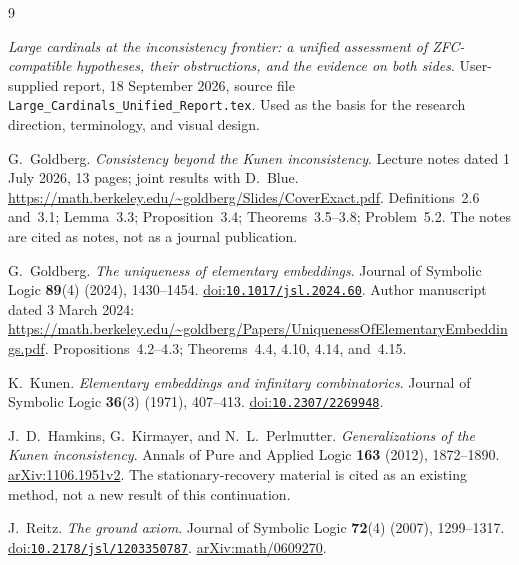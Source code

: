 \documentclass[11pt,letterpaper]{article}
\theoremstyle{definition}
\newcommand{\arxiv}[1]{\href{https://arxiv.org/abs/#1}{arXiv:#1}}
\newcommand{\doi}[1]{\href{https://doi.org/#1}{doi:\nolinkurl{#1}}}
\begin{document}
\clearpage
{}
{}
\begin{thebibliography}{9}
\small
\setlength{\itemsep}{6pt}
\setlength{\parskip}{1pt}

\emph{Large cardinals at the inconsistency frontier: a unified assessment of ZFC-compatible hypotheses, their obstructions, and the evidence on both sides}.
User-supplied report, 18 September 2026, source file
\texttt{Large\_Cardinals\_Unified\_Report.tex}.
Used as the basis for the research direction, terminology, and visual design.

G.~Goldberg.
\emph{Consistency beyond the Kunen inconsistency}.
Lecture notes dated 1 July 2026, 13 pages; joint results with D.~Blue.
\url{https://math.berkeley.edu/~goldberg/Slides/CoverExact.pdf}.
Definitions~2.6 and~3.1; Lemma~3.3; Proposition~3.4; Theorems~3.5--3.8; Problem~5.2.
The notes are cited as notes, not as a journal publication.

G.~Goldberg.
\emph{The uniqueness of elementary embeddings}.
Journal of Symbolic Logic \textbf{89}(4) (2024), 1430--1454.
\doi{10.1017/jsl.2024.60}.
Author manuscript dated 3 March 2024:
\url{https://math.berkeley.edu/~goldberg/Papers/UniquenessOfElementaryEmbeddings.pdf}.
Propositions~4.2--4.3; Theorems~4.4, 4.10, 4.14, and~4.15.

K.~Kunen.
\emph{Elementary embeddings and infinitary combinatorics}.
Journal of Symbolic Logic \textbf{36}(3) (1971), 407--413.
\doi{10.2307/2269948}.

J.~D.~Hamkins, G.~Kirmayer, and N.~L.~Perlmutter.
\emph{Generalizations of the Kunen inconsistency}.
Annals of Pure and Applied Logic \textbf{163} (2012), 1872--1890.
\arxiv{1106.1951v2}.
The stationary-recovery material is cited as an existing method, not a new result of this continuation.

J.~Reitz.
\emph{The ground axiom}.
Journal of Symbolic Logic \textbf{72}(4) (2007), 1299--1317.
\doi{10.2178/jsl/1203350787}.
\arxiv{math/0609270}.

\end{thebibliography}
\end{document}
